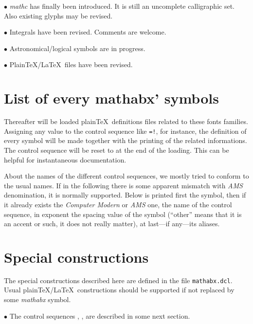 \item{$\bullet$} {\it mathc}\/ has finally been introduced.
It is still an uncomplete calligraphic set. Also existing glyphs
may be revised.

\item{$\bullet$} Integrals have been revised. Comments are welcome.

\item{$\bullet$} Astronomical/logical symbols are in progress.

\item{$\bullet$} Plain\TeX/\LaTeX\ files have been revised.
 
\section{List of every mathabx' symbols}

Thereafter will be loaded
plain\TeX\ definitions files related to these fonts families.
Assigning any value to the control sequence\/ {\tt\string\proofmode}
like\/ {\tt\string\let\string\proofmode=!}, for instance,
the definition of every symbol will be made together with the
printing of the related informations. The control sequence
{\tt\string\proofmode} will be reset to\/ {\tt\string\undefined}
at the end of the loading. This can be helpful for instantaneous
documentation.

About the names of the different control sequences, we mostly tried to
conform to the usual names. If in the following there is some apparent
mismatch with\/ {\it AMS}\/ denomination, it is normally supported.
Below is printed first the symbol, then if it already exists the {\it
Computer Modern}\/ or\/ {\it AMS}\/ one, the name of the control
sequence, in exponent the spacing value of the symbol (``other''
means that it is an accent or such, it does not really matter),
at last---if any---its aliases.

\let\proofmode=!
\fuzzytext

\normaltext

\section{Special constructions}

The special constructions described here are defined in the file
{\tt mathabx.dcl}. Usual plain\TeX/\LaTeX\ constructions should
be supported if not replaced by some {\it mathabx}\/ symbol.

\item{$\bullet$}
The control sequences
{\tt\string\not}, {\tt\string\varnot}, {\tt\string\changenotsign}
are described in some next section.

